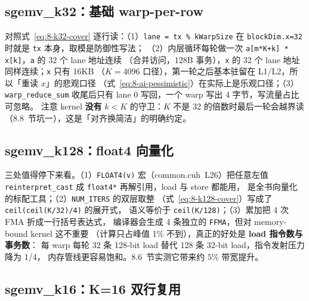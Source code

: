\subsection{sgemv\_k32：基础 warp-per-row}



对照式~\ref{eq:8-k32-cover} 逐行读：（1）\texttt{lane = tx \% kWarpSize} 在
\texttt{block\allowbreak{}Dim.\allowbreak{}x=\allowbreak{}32} 时就是 \texttt{tx} 本身，取模是防御性写法；
（2）内层循环每轮做一次 \texttt{a[m*K+k] * x[k]}，\texttt{a} 的 32 个 lane 地址连续
（合并访问，128B 事务），\texttt{x} 的 32 个 lane 地址同样连续；\texttt{x} 只有 16KB
（$K=4096$ 口径），第一轮之后基本驻留在 L1/L2，所以「重读 $x$」的悲观口径
（式~\ref{eq:8-ai-pessimistic}）在实际上是乐观口径；（3）\texttt{warp\_\allowbreak{}reduce\_\allowbreak{}sum}
收尾后只有 lane 0 写回，一个 warp 写出 4 字节，写流量占比可忽略。
注意 kernel \textbf{没有} $k < K$ 的守卫：$K$ 不是 32 的倍数时最后一轮会越界读
（8.8~节坑一），这是「对齐换简洁」的明确约定。

\subsection{sgemv\_k128：float4 向量化}



三处值得停下来看。（1）\texttt{FLOAT4(v)} 宏（common.cuh~L26）把任意左值
\texttt{reinterpret\_\allowbreak{}cast} 成 \texttt{float4*} 再解引用，load 与 store 都能用，
是全书向量化的标配工具；（2）\texttt{NUM\_ITERS} 的双层取整
（式~\ref{eq:8-k128-cover}）写成了 \texttt{ceil\allowbreak{}(ceil\allowbreak{}(K/\allowbreak{}32)/\allowbreak{}4)} 的展开式，
语义等价于 \texttt{ceil(K/128)}；（3）累加把 4 次 FMA 折成一行括号表达式，
编译器会生成 4 条独立的 \texttt{FFMA}，但对 memory-bound kernel 这不重要
（计算只占峰值 1\% 不到），真正的好处是 \textbf{load 指令数与事务数}：
每 warp 每轮 32 条 128-bit load 替代 128 条 32-bit load，指令发射压力降为 1/4，
内存管线更容易饱和。8.6~节实测它带来约 $5\%$ 带宽提升。

\subsection{sgemv\_k16：K=16 双行复用}



